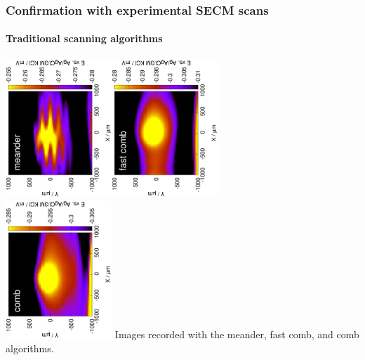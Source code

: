 \documentclass{beamer}
\begin{document}
\begin{frame}
	\frametitle{Confirmation with experimental SECM scans}
	\framesubtitle{Traditional scanning algorithms}
	\includegraphics[width=0.3\textwidth, angle=-90]{meander.eps}\includegraphics[width=0.3\textwidth, angle=-90]{fastcomb.eps}\\
	\includegraphics[width=0.3\textwidth, angle=-90]{comb.eps}
	\vfill
	Images recorded with the meander, fast comb, and comb algorithms.
\end{frame}
\end{document}
